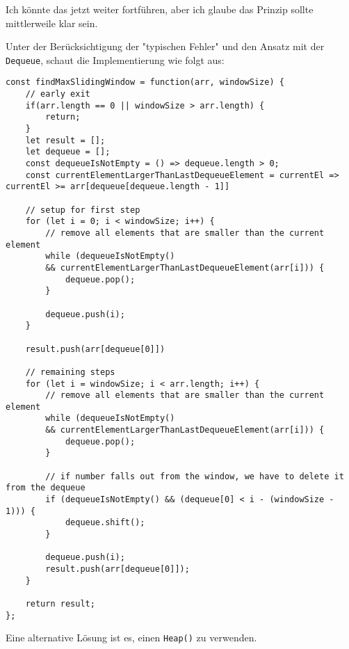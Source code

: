 \documentclass[babel]{book}
\begin{document}
Ich könnte das jetzt weiter fortführen, aber ich glaube das Prinzip sollte mittlerweile klar sein.

Unter der Berücksichtigung der "typischen Fehler" und den Ansatz mit der \lstinline|Dequeue|, schaut die Implementierung wie folgt aus:

\begin{lstlisting}[caption=My Javascript Example]
const findMaxSlidingWindow = function(arr, windowSize) {  
	// early exit
	if(arr.length == 0 || windowSize > arr.length) {
		return;
	}
	let result = [];
	let dequeue = [];
	const dequeueIsNotEmpty = () => dequeue.length > 0;
	const currentElementLargerThanLastDequeueElement = currentEl => currentEl >= arr[dequeue[dequeue.length - 1]]
	
	// setup for first step
	for (let i = 0; i < windowSize; i++) {
		// remove all elements that are smaller than the current element
		while (dequeueIsNotEmpty() 
		&& currentElementLargerThanLastDequeueElement(arr[i])) {
			dequeue.pop();
		}
		
		dequeue.push(i);
	}
	
	result.push(arr[dequeue[0]])
	
	// remaining steps  
	for (let i = windowSize; i < arr.length; i++) {
		// remove all elements that are smaller than the current element
		while (dequeueIsNotEmpty() 
		&& currentElementLargerThanLastDequeueElement(arr[i])) {
			dequeue.pop();
		}
		
		// if number falls out from the window, we have to delete it from the dequeue
		if (dequeueIsNotEmpty() && (dequeue[0] < i - (windowSize - 1))) {
			dequeue.shift();
		}
		
		dequeue.push(i);
		result.push(arr[dequeue[0]]);
	}
	
	return result;
};
\end{lstlisting}

Eine alternative Lösung ist es, einen \lstinline|Heap()| zu verwenden.
\medskip
\end{document}
